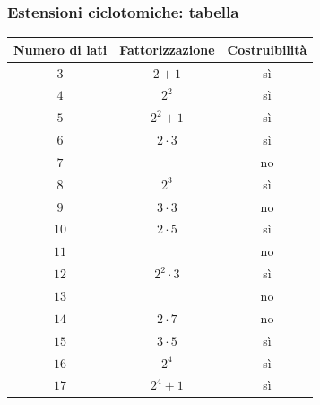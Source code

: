 \documentclass[11pt]{beamer}
\begin{document}
\begin{frame}
\frametitle{Estensioni ciclotomiche: tabella}
\begin{center}
\begin{tabular}{c c c}
Numero di lati  & Fattorizzazione & Costruibilità \\
\hline
$3$  &  $2+1$  & sì \\
$4$  &  $2^2$  & sì \\
$5$  &  $2^2+1$  & sì \\
$6$  &  $2\cdot3$  & sì \\
$7$  &                 & no \\
$8$  &  $2^3$  & sì \\
$9$  &  $3\cdot3$  & no \\
$10$  &  $2\cdot5$  & sì \\
$11$  &                    & no \\
$12$  &  $2^2\cdot3$  & sì \\
$13$  &                  & no \\
$14$  &  $2\cdot7$  & no \\
$15$  &  $3\cdot5$  & sì \\
$16$  &  $2^4$  & sì \\
$17$  &  $2^4 + 1$  & sì \\
\hline
\end{tabular}
\end{center}
\end{frame}
\end{document}

